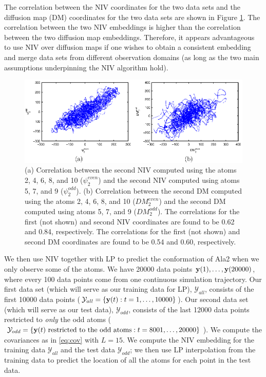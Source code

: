 The correlation between the NIV coordinates for the two data sets and the diffusion map (DM) coordinates for the two data sets are shown in Figure \ref{fig:ala_corr}.
%
The correlation between the two NIV embeddings is higher than the correlation between the two diffusion map embeddings.
Therefore, it appears advantageous to use NIV over diffusion maps if one wishes to obtain a consistent embedding and merge data sets from different observation domains (as long as the two main assumptions underpinning the NIV algorithm hold).

\begin{figure}[t]
    \includegraphics[width=6in]{fig7}
    \caption[Comparison of intrinsic variable and diffusion maps embeddings for alanine dipeptide data]{(a) Correlation between the second NIV computed using the atoms 2, 4, 6, 8, and 10 ($\psi_2^{even}$) and the second NIV computed using atoms 5, 7, and 9 ($\psi_2^{odd}$).
    (b) Correlation between the second DM computed using the atoms 2, 4, 6, 8, and 10 ($DM_2^{even}$) and the second DM computed using atoms 5, 7, and 9 ($DM_2^{odd}$).
    The correlations for the first (not shown) and second NIV coordinates are found to be 0.62 and 0.84, respectively.
    The correlations for the first (not shown) and second DM coordinates are found to be 0.54 and 0.60, respectively. }
    \label{fig:ala_corr}
\end{figure}

We then use NIV together with LP to predict the conformation of Ala2 when we only observe some of the atoms.
%
We have 20000 data points $\mathbf{y}(1), \dots, \mathbf{y}(20000)$, where every 100 data points come from one continuous simulation trajectory.
%
Our first data set (which will serve as our training data for LP), $\mathcal{Y}_{all}$,
consists of the first 10000 data points ($\mathcal{Y}_{all} = \{\mathbf{y}(t): t=1, \dots, 10000\}$).
%
Our second data set (which will serve as our test data), $\mathcal{Y}_{odd}$, consists of the last 12000 data points restricted to {\em only} the odd atoms
($\mathcal{Y}_{odd} = \{ \mathbf{y}(t) \text{ restricted to the odd atoms}: t = 8001, \dots, 20000\}$).
%
We compute the covariances as in \eqref{eq:cov} with $L=15$.
%
We compute the NIV embedding for the training data $\mathcal{Y}_{all}$ and the test data $\mathcal{Y}_{odd}$; we then use LP interpolation from the training data to predict the location of all the atoms for each point in the test data.

